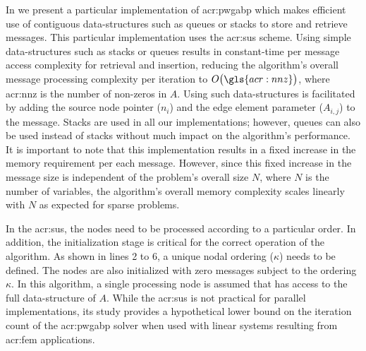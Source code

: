 In  we present a particular implementation of \gls{acr:pwgabp} which makes efficient use of contiguous data-structures such as queues or stacks to store and retrieve messages.
This particular implementation uses the \gls{acr:sus} scheme.
Using simple data-structures such as stacks or queues results in constant-time per message access complexity for retrieval and insertion, reducing the algorithm's overall message processing complexity per iteration to $\bigo{\gls{acr:nnz}}$, where \gls{acr:nnz} is the number of non-zeros in $A$.
Using such data-structures is facilitated by adding the source node pointer ($n_i$) and the edge element parameter ($A_{i,j}$) to the message.
Stacks are used in all our implementations; however, queues can also be used instead of stacks without much impact on the algorithm's performance.  
It is important to note that this implementation results in a fixed increase in the memory requirement per each message.  
However, since this fixed increase in the message size is independent of the problem's overall size $N$, where $N$ is the number of variables, the algorithm's overall memory complexity scales linearly with $N$ as expected for sparse problems.


In the \gls{acr:sus}, the nodes need to be processed according to a particular order.
In addition, the initialization stage is critical for the correct operation of the algorithm.
As shown in lines 2 to 6, a unique nodal ordering ($\kappa$) needs to be defined.
The nodes are also initialized with zero messages subject to the ordering $\kappa$.
In this algorithm, a single processing node is assumed that has access to the full data-structure of $A$.
While the \gls{acr:sus} is not practical for parallel implementations, its study provides a hypothetical lower bound on the iteration count of the \gls{acr:pwgabp} solver when used with linear systems resulting from \gls{acr:fem} applications.

